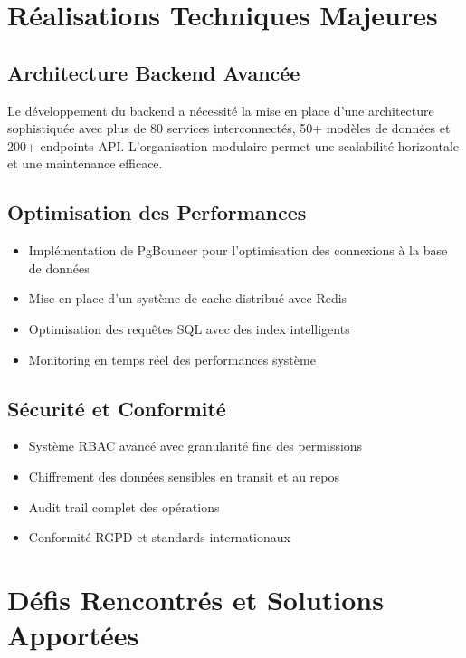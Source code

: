 \documentclass[12pt,a4paper]{article}
\begin{document}
\section{Réalisations Techniques Majeures}

\subsection{Architecture Backend Avancée}

Le développement du backend a nécessité la mise en place d'une architecture sophistiquée avec plus de 80 services interconnectés, 50+ modèles de données et 200+ endpoints API. L'organisation modulaire permet une scalabilité horizontale et une maintenance efficace.

\subsection{Optimisation des Performances}

\begin{itemize}
    \item Implémentation de PgBouncer pour l'optimisation des connexions à la base de données
    \item Mise en place d'un système de cache distribué avec Redis
    \item Optimisation des requêtes SQL avec des index intelligents
    \item Monitoring en temps réel des performances système
\end{itemize}

\subsection{Sécurité et Conformité}

\begin{itemize}
    \item Système RBAC avancé avec granularité fine des permissions
    \item Chiffrement des données sensibles en transit et au repos
    \item Audit trail complet des opérations
    \item Conformité RGPD et standards internationaux
\end{itemize}

\section{Défis Rencontrés et Solutions Apportées}
\end{document}
